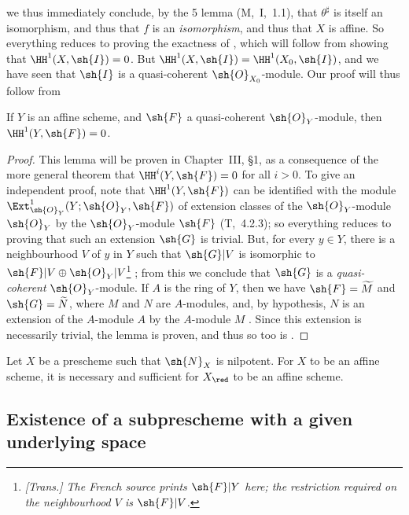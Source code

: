 we thus immediately conclude, by the 5 lemma (M,~I,~1.1), that $\theta^\sharp$ is itself an isomorphism, and thus that $f$ is an \emph{isomorphism}, and thus that $X$ is affine.
So everything reduces to proving the exactness of , which will follow from showing that $\HH^1(X,\sh{I})=0$.
But $\HH^1(X,\sh{I})=\HH^1(X_0,\sh{I})$, and we have seen that $\sh{I}$ is a quasi-coherent $\sh{O}_{X_0}$-module.
Our proof will thus follow from
\begin{lemma}[5.1.9.2]
\label{I.5.1.9.2}
If $Y$ is an affine scheme, and $\sh{F}$ a quasi-coherent $\sh{O}_Y$-module, then $\HH^1(Y,\sh{F})=0$.
\end{lemma}

\begin{proof}
This lemma will be proven in Chapter~III, §1, as a consequence of the more general theorem that $\HH^i(Y,\sh{F})=0$ for all $i>0$.
To give an independent proof, note that $\HH^1(Y,\sh{F})$ can be identified with the module $\Ext_{\sh{O}_Y}^1(Y;\sh{O}_Y,\sh{F})$ of extension classes of the $\sh{O}_Y$-module $\sh{O}_Y$ by the $\sh{O}_Y$-module $\sh{F}$ (T,~4.2.3);
so everything reduces to proving that such an extension $\sh{G}$ is trivial.
But, for every $y\in Y$, there is a neighbourhood $V$ of $y$ in $Y$ such that $\sh{G}|V$ is isomorphic to $\sh{F}|V\oplus\sh{O}_Y|V$\footnote{\emph{[Trans.] The French source prints $\sh{F}|Y$ here; the restriction required on the neighbourhood $V$ is $\sh{F}|V$.}} ;
from this we conclude that $\sh{G}$ is a \emph{quasi-coherent} $\sh{O}_Y$-module.
If $A$ is the ring of $Y$, then we have $\sh{F}=\widetilde{M}$ and $\sh{G}=\widetilde{N}$, where $M$ and $N$ are $A$-modules, and, by hypothesis, $N$ is an extension of the $A$-module $A$ by the $A$-module $M$ .
Since this extension is necessarily trivial, the lemma is proven, and thus so too is .
\end{proof}

\begin{corollary}[5.1.10]
\label{I.5.1.10}
Let $X$ be a prescheme such that $\sh{N}_X$ is nilpotent.
For $X$ to be an affine scheme, it is necessary and sufficient for $X_\red$ to be an affine scheme.
\end{corollary}

\subsection{Existence of a subprescheme with a given underlying space}
\label{subsection:I.5.2}

